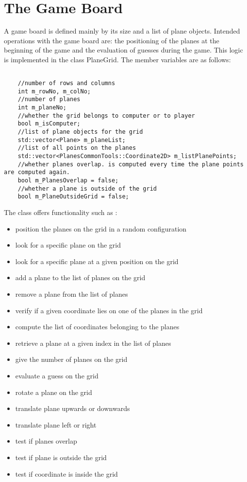 \section{The Game Board}

A game board is defined mainly by its size and a list of plane objects. Intended operations with the game board are: the positioning of the planes at the beginning of the game and the evaluation of guesses during the game. This logic is implemented in the class PlaneGrid. The member variables are as follows:

\begin{lstlisting}

	//number of rows and columns
	int m_rowNo, m_colNo;
	//number of planes
	int m_planeNo;
	//whether the grid belongs to computer or to player
	bool m_isComputer;
	//list of plane objects for the grid
	std::vector<Plane> m_planeList;
	//list of all points on the planes
	std::vector<PlanesCommonTools::Coordinate2D> m_listPlanePoints;
	//whether planes overlap. is computed every time the plane points are computed again.
	bool m_PlanesOverlap = false;
	//whether a plane is outside of the grid
	bool m_PlaneOutsideGrid = false;

\end{lstlisting}

The class offers functionality such as :
\begin{itemize}
	\item position the planes on the grid in a random configuration
	\item look for a specific plane on the grid
	\item look for a specific plane at a given position on the grid
	\item add a plane to the list of planes on the grid
	\item remove a plane from the list of planes
	\item verify if a given coordinate lies on one of the planes in the grid
	\item compute the list of coordinates belonging to the planes
	\item retrieve a plane at a given index in the list of planes
	\item give the number of planes on the grid
	\item evaluate a guess on the grid
	\item rotate a plane on the grid
	\item translate plane upwards or downwards
	\item translate plane left or right
	\item test if planes overlap
	\item test if plane is outside the grid
	\item test if coordinate is inside the grid

\end{itemize}